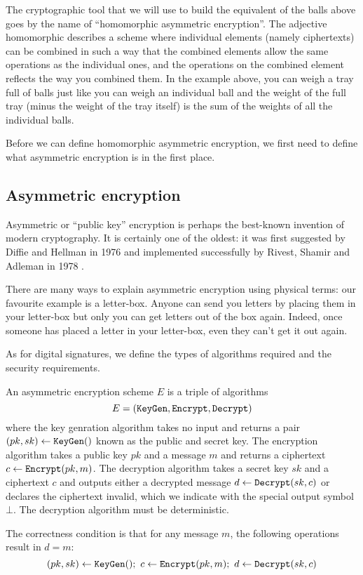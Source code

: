 \documentclass{llncs}
\newcommand{\alg}[1]{\textup{\texttt{#1}}}
\begin{document}
The cryptographic tool that we will use to build the equivalent of the balls
above goes by the name of ``homomorphic asymmetric encryption''. The adjective
homomorphic describes a scheme where individual elements (namely ciphertexts)
can be combined in such a way that the combined elements allow the same
operations as the individual ones, and the operations on the combined element
reflects the way you combined them. In the example above, you can weigh a tray
full of balls just like you can weigh an individual ball and the weight of the
full tray (minus the weight of the tray itself) is the sum of the weights of all
the individual balls.

Before we can define homomorphic asymmetric encryption, we first need to define
what asymmetric encryption is in the first place.


\subsection{Asymmetric encryption}

Asymmetric or ``public key'' encryption is perhaps the best-known invention of
modern cryptography. It is certainly one of the oldest: it was first suggested
by Diffie and Hellman in 1976 \cite{DH76} and implemented successfully by
Rivest, Shamir and Adleman in 1978 \cite{RSA78}.

There are many ways to explain asymmetric encryption using physical terms: our
favourite example is a letter-box. Anyone can send you letters by placing them
in your letter-box but only you can get letters out of the box again\footnotemark. Indeed, once someone has placed a letter in your letter-box, even
they can't get it out again.


As for digital signatures, we
define the types of algorithms required and the security requirements.

\begin{definition}
An asymmetric encryption scheme $E$ is a triple of algorithms
\[ E = \left(
\alg{KeyGen}, \alg{Encrypt}, \alg{Decrypt}
\right) \]
where the key genration algorithm takes no input and returns a pair $(pk, sk)
\gets \alg{KeyGen}()$ known as the public and secret key. The encryption
algorithm takes a public key $pk$ and a message $m$ and returns a ciphertext $c
\gets \alg{Encrypt}(pk, m)$. The decryption algorithm takes a secret key $sk$
and a ciphertext $c$ and outputs either a decrypted message $d \gets
\alg{Decrypt}(sk, c)$ or declares the ciphertext invalid, which we indicate with
the special output symbol $\bot$. The decryption algorithm must be deterministic.

The correctness condition is that for any message $m$, the following operations
result in $d = m$:
\[
(pk, sk) \gets \alg{KeyGen}();\ 
c \gets \alg{Encrypt}(pk, m);\ 
d \gets \alg{Decrypt}(sk, c)
\]
\end{definition}
\end{document}
